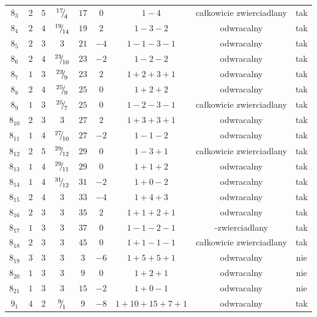 \begin{longtable}{ccccccccc}
$8_{3}$ & $2$ & $5$ & ${}^{17}{\mskip -5mu/\mskip -3mu}_{4}$ & $17$ & $0$ & $1-4$ & całkowicie zwierciadlany & tak \\
$8_{4}$ & $2$ & $4$ & ${}^{19}{\mskip -5mu/\mskip -3mu}_{14}$ & $19$ & $2$ & $1-3-2$ & odwracalny & tak \\
$8_{5}$ & $2$ & $3$ & $3$ & $21$ & $-4$ & $1-1-3-1$ & odwracalny & tak \\
$8_{6}$ & $2$ & $4$ & ${}^{23}{\mskip -5mu/\mskip -3mu}_{10}$ & $23$ & $-2$ & $1-2-2$ & odwracalny & tak \\
$8_{7}$ & $1$ & $3$ & ${}^{23}{\mskip -5mu/\mskip -3mu}_{9}$ & $23$ & $2$ & $1+2+3+1$ & odwracalny & tak \\
$8_{8}$ & $2$ & $4$ & ${}^{25}{\mskip -5mu/\mskip -3mu}_{9}$ & $25$ & $0$ & $1+2+2$ & odwracalny & tak \\
$8_{9}$ & $1$ & $3$ & ${}^{25}{\mskip -5mu/\mskip -3mu}_{7}$ & $25$ & $0$ & $1-2-3-1$ & całkowicie zwierciadlany & tak \\
$8_{10}$ & $2$ & $3$ & $3$ & $27$ & $2$ & $1+3+3+1$ & odwracalny & tak \\
$8_{11}$ & $1$ & $4$ & ${}^{27}{\mskip -5mu/\mskip -3mu}_{10}$ & $27$ & $-2$ & $1-1-2$ & odwracalny & tak \\
$8_{12}$ & $2$ & $5$ & ${}^{29}{\mskip -5mu/\mskip -3mu}_{12}$ & $29$ & $0$ & $1-3+1$ & całkowicie zwierciadlany & tak \\
$8_{13}$ & $1$ & $4$ & ${}^{29}{\mskip -5mu/\mskip -3mu}_{11}$ & $29$ & $0$ & $1+1+2$ & odwracalny & tak \\
$8_{14}$ & $1$ & $4$ & ${}^{31}{\mskip -5mu/\mskip -3mu}_{12}$ & $31$ & $-2$ & $1+0-2$ & odwracalny & tak \\
$8_{15}$ & $2$ & $4$ & $3$ & $33$ & $-4$ & $1+4+3$ & odwracalny & tak \\
$8_{16}$ & $2$ & $3$ & $3$ & $35$ & $2$ & $1+1+2+1$ & odwracalny & tak \\
$8_{17}$ & $1$ & $3$ & $3$ & $37$ & $0$ & $1-1-2-1$ & -zwierciadlany & tak \\
$8_{18}$ & $2$ & $3$ & $3$ & $45$ & $0$ & $1+1-1-1$ & całkowicie zwierciadlany & tak \\
$8_{19}$ & $3$ & $3$ & $3$ & $3$ & $-6$ & $1+5+5+1$ & odwracalny & nie \\
$8_{20}$ & $1$ & $3$ & $3$ & $9$ & $0$ & $1+2+1$ & odwracalny & nie \\
$8_{21}$ & $1$ & $3$ & $3$ & $15$ & $-2$ & $1+0-1$ & odwracalny & nie \\
$9_{1}$ & $4$ & $2$ & ${}^{9}{\mskip -5mu/\mskip -3mu}_{1}$ & $9$ & $-8$ & $1+10+15+7+1$ & odwracalny & tak \\

\end{longtable}
